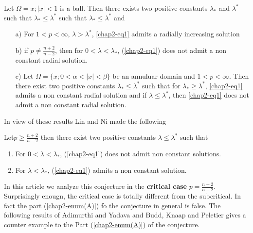 \begin{theorem}\label{chap2-thm2}
Let $\Omega = {x; |x| < 1 }$ is a ball. Then there exists two positive constants $\lambda_{*}$ and $\lambda^{*}$  such that 
$\lambda_{*} \leq \lambda^{*}$ such that $\lambda_{*} \leq \lambda^{*}$ and
\begin{itemize}
\item[a)]For $1< p < \infty$, $\lambda > \lambda^{*}$, \eqref{chap2-eq1} admits a radially increasing solution
\item[b)] if $p \neq \frac{n+2}{n-2}$, then for $0< \lambda <  \lambda_{*}$, (\ref{chap2-eq1}) does not admit a non constant radial solution.
\item[c)] Let $\Omega = \{x; 0 < \alpha < |x| < \beta\}$ be an annuluar domain and $ 1 < p < \infty$. Then there exist two positive constants $\lambda_{*} \leq \lambda^{*}$ such that for $\lambda_{*} \geq \lambda^{*}$, \eqref{chap2-eq1} admits a non constant radial solution and if $\lambda \leq \lambda^{*}$, then \eqref{chap2-eq1} does not admit a non constant radial solution. 
\end{itemize}
\end{theorem} 

In view of these results Lin and Ni \cite{chap2-key15} made the following

\begin{conjecture*}
Let\pageoriginale $p \geq \frac{n+2}{n-2}$ then there exist two positive constants $\lambda \leq \lambda^{*}$ such that
\begin{enumerate}[\rm (A)]
\item For $0 < \lambda < \lambda_{*}$, (\ref{chap2-eq1}) does not admit non constant solutions.\label{chap2-enum(A)}
\item For $\lambda < \lambda_{*}$, (\ref{chap2-eq1}) admits a non constant solution.\label{chap2-enum(B)}
\end{enumerate}

 In this article we analyze this conjecture in the \textbf{critical case} $p = \frac{n+2}{n-2}$. Surprisingly enougn, the critical case is totally different from the subcritical. In fact the part (\ref{chap2-enum(A)}) fo the conjecture in general is false. The following results of Adimurthi and Yadava \cite{chap2-key4} and Budd, Knaap and Peletier \cite{chap2-key12} gives a counter example to the Part (\ref{chap2-enum(A)}) of the conjecture.
\end{conjecture*}

